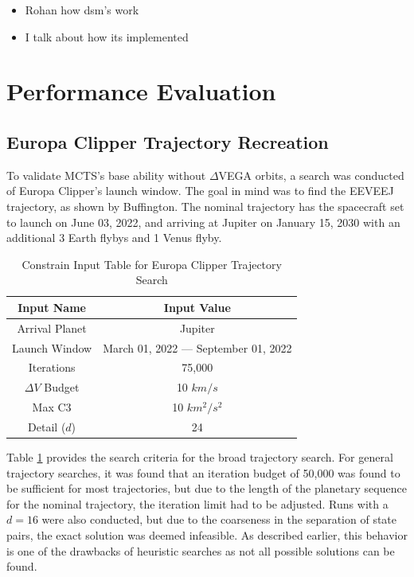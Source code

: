 \documentclass[letterpaper, preprint, paper,11pt]{AAS}	%
\begin{document}
\begin{itemize}
    \item Rohan how dsm's work
    
    \item I talk about how its implemented
\end{itemize}

\section{Performance Evaluation}
\subsection{Europa Clipper Trajectory Recreation}

To validate MCTS's base ability without $\Delta$VEGA orbits, a search was conducted of Europa Clipper's launch window. The goal in mind was to find the EEVEEJ trajectory, as shown by Buffington\cite{Buffington2014}. The nominal trajectory has the spacecraft set to launch on June 03, 2022, and arriving at Jupiter on January 15, 2030 with an additional 3 Earth flybys and 1 Venus flyby.
\begin{table}[htb]
\begin{center}
    \caption{Constrain Input Table for Europa Clipper Trajectory Search}
    \label{table:clipInputs}
    \begin{tabular}{c|c}
        \textbf{Input Name} & \textbf{Input Value}\\
        \hline
        Arrival Planet & Jupiter \\
        Launch Window & March 01, 2022 --- September 01, 2022 \\
        Iterations & 75,000 \\ 
        $\Delta V$ Budget & 10 $km/s$ \\
        Max C3 & 10 $km^2/s^2$ \\
        Detail ($d$) & 24 
    \end{tabular}
\end{center}
\end{table}

Table \ref*{table:clipInputs} provides the search criteria for the broad trajectory search. For general trajectory searches, it was found that an iteration budget of 50,000 was found to be sufficient for most trajectories, but due to the length of the planetary sequence for the nominal trajectory, the iteration limit had to be adjusted. Runs with a $d = 16$ were also conducted, but due to the coarseness in the separation of state pairs, the exact solution was deemed infeasible. As described earlier, this behavior is one of the drawbacks of heuristic searches as not all possible solutions can be found. 
\end{document}
